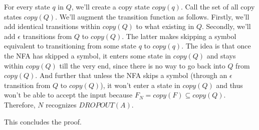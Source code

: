 \documentclass{article}
\begin{document}
For every state $q$ in $Q$, we'll create a copy state $copy(q)$. Call the set of all copy states $copy(Q)$. We'll augment the transition function as follows. Firstly, we'll add identical transitions within $copy(Q)$ to what existing in $Q$. Secondly, we'll add $\epsilon$ transitions from $Q$ to $copy(Q)$. The latter makes skipping a symbol equivalent to transitioning from some state $q$ to $copy(q)$. The idea is that once the NFA has skipped a symbol, it enters some state in $copy(Q)$ and stays within $copy(Q)$ till the very end, since there is no way to go back into $Q$ from $copy(Q)$. And further that unless the NFA skips a symbol (through an $\epsilon$ transition from $Q$ to $copy(Q)$), it won't enter a state in $copy(Q)$ and thus won't be able to accept the input because $F_N = copy(F) \subseteq copy(Q)$. Therefore, $N$ recognizes $DROPOUT(A)$.

This concludes the proof.
\end{document}
